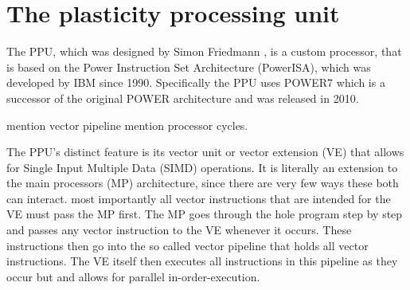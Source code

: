 \chapter{The plasticity processing unit}
\label{chapter:insn coding}

The PPU, which was designed by Simon Friedmann , is a custom processor, that is based on the Power Instruction Set Architecture (PowerISA), which was developed by IBM since 1990. 
Specifically the PPU uses POWER7 which is a successor of the original POWER architecture and was released in 2010.

mention vector pipeline
mention processor cycles.

The PPU's distinct feature is its vector unit or vector extension (VE) that allows for Single Input Multiple Data (SIMD) operations.
It is literally an extension to the main processors (MP) architecture, since there are very few ways these both can interact.
most importantly all vector instructions that are intended for the VE must pass the MP first.
The MP goes through the hole program step by step and passes any vector instruction to the VE whenever it occurs.
These instructions then go into the so called vector pipeline that holds all vector instructions.
The VE itself then executes all instructions in this pipeline as they occur but and allows for parallel in-order-execution.


